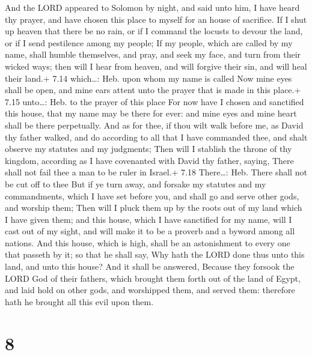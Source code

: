  And the LORD appeared to Solomon by night, and said unto
him, I have heard thy prayer, and have chosen this place to myself for
an house of sacrifice.  If I shut up heaven that there be
no rain, or if I command the locusts to devour the land, or if I send
pestilence among my people;  If my people, which are called
by my name, shall humble themselves, and pray, and seek my face, and
turn from their wicked ways; then will I hear from heaven, and will
forgive their sin, and will heal their land.+ 7.14 which\ldots: Heb.
upon whom my name is called  Now mine eyes shall be open,
and mine ears attent unto the prayer that is made in this place.+ 7.15
unto\ldots: Heb. to the prayer of this place  For now have
I chosen and sanctified this house, that my name may be there for ever:
and mine eyes and mine heart shall be there perpetually. 
And as for thee, if thou wilt walk before me, as David thy father
walked, and do according to all that I have commanded thee, and shalt
observe my statutes and my judgments;  Then will I stablish
the throne of thy kingdom, according as I have covenanted with David thy
father, saying, There shall not fail thee a man to be ruler in Israel.+
7.18 There\ldots: Heb. There shall not be cut off to thee 
But if ye turn away, and forsake my statutes and my commandments, which
I have set before you, and shall go and serve other gods, and worship
them;  Then will I pluck them up by the roots out of my
land which I have given them; and this house, which I have sanctified
for my name, will I cast out of my sight, and will make it to be a
proverb and a byword among all nations.  And this house,
which is high, shall be an astonishment to every one that passeth by it;
so that he shall say, Why hath the LORD done thus unto this land, and
unto this house?  And it shall be answered, Because they
forsook the LORD God of their fathers, which brought them forth out of
the land of Egypt, and laid hold on other gods, and worshipped them, and
served them: therefore hath he brought all this evil upon them.

\hypertarget{section-7}{%
\section{8}\label{section-7}}

